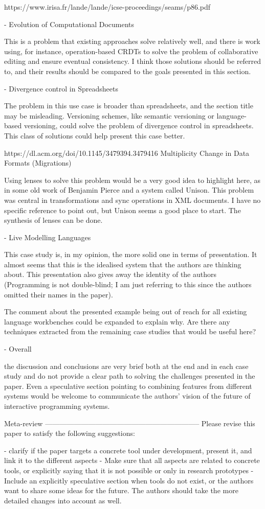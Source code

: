 https://www.irisa.fr/lande/lande/icse-proceedings/seams/p86.pdf

- Evolution of Computational Documents

This is a problem that existing approaches solve relatively well, and there is work using, for instance, operation-based CRDTs to solve the problem of collaborative editing and ensure eventual consistency. I think those solutions should be referred to, and their results should be compared to the goals presented in this section.

- Divergence control in Spreadsheets

The problem in this use case is broader than spreadsheets, and the section title may be misleading. Versioning schemes, like semantic versioning or language-based versioning, could solve the problem of divergence control in spreadsheets. This class of solutions could help present this case better.

https://dl.acm.org/doi/10.1145/3479394.3479416
Multiplicity Change in Data Formats (Migrations)

Using lenses to solve this problem would be a very good idea to highlight here, as in some old work of Benjamin Pierce and a system called Unison. This problem was central in transformations and sync operations in XML documents. I have no specific reference to point out, but Unison seems a good place to start. The synthesis of lenses can be done.

- Live Modelling Languages

This case study is, in my opinion, the more solid one in terms of presentation. It almost seems that this is the idealised system that the authors are thinking about. This presentation also gives away the identity of the authors (Programming is not double-blind; I am just referring to this since the authors omitted their names in the paper).

The comment about the presented example being out of reach for all existing language workbenches could be expanded to explain why. Are there any techniques extracted from the remaining case studies that would be useful here?

- Overall

the discussion and conclusions are very brief both at the end and in each case study and do not provide a clear path to solving the challenges presented in the paper. Even a speculative section pointing to combining features from different systems would be welcome to communicate the authors' vision of the future of interactive programming systems.


Meta-review
-----------------------------------------------------------------
Please revise this paper to satisfy the following suggestions:

- clarify if the paper targets a concrete tool under development, present it, and link it to the different aspects
- Make sure that all aspects are related to concrete tools, or explicitly saying that it is not possible or only in research prototypes
- Include an explicitly speculative section when tools do not exist, or the authors want to share some ideas for the future. The authors should take the more detailed changes into account as well.